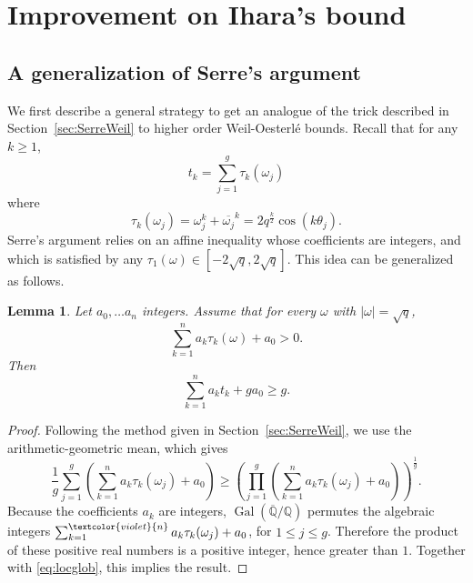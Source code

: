 \documentclass{amsart}
\newtheorem{lemma}[defin]{Lemma}
\newcommand{\Q}{\mathbb{Q}}
\DeclareMathOperator{\Gal}{Gal}
\begin{document}
%
%
\section{Improvement on Ihara's bound}\label{sIS}

\subsection{A generalization of Serre's argument}

We first describe a general strategy to get an analogue of the trick described in Section~\ref{sec:SerreWeil} to higher order Weil-Oesterl\'e bounds. 
Recall that for any $k\geq 1$, 
\begin{equation}\label{eq:locglob}
t_k = \sum_{j=1}^g \tau_k(\omega_j)
\end{equation}
where 
\[
\tau_k(\omega_j) = \omega_j^k + \overline{\omega_j}^k = 2 q^\frac{k}{2} \cos(k \theta_j).
\]
Serre's argument relies on an affine inequality whose coefficients are integers, and which is satisfied by any $\tau_1(\omega) \in [-2\sqrt{q},2\sqrt{q}]$.
This idea can be generalized as follows.
\begin{lemma}\label{lem:GenSer}
Let $a_0, \ldots a_n$ integers. 
Assume that for every $\omega$ with $\left| \omega \right| = \sqrt{q}$,
\begin{equation}\label{eq:ineq}
\sum_{k=1}^n a_k\tau_k(\omega) + a_0> 0.
\end{equation}
Then 
\begin{equation}
\sum_{k=1}^n a_kt_k + ga_0 \geq g.
\end{equation}
\end{lemma}
\begin{proof}
Following the method given in Section~\ref{sec:SerreWeil}, we use the arithmetic-geometric mean, which gives
\begin{equation}\label{eq:genamgm}
\frac{1}{g}\sum_{j=1}^g \left(\sum_{k=1}^n a_k\tau_k(\omega_j) + a_0 \right) \geq \left( \prod_{j=1}^g \left(\sum_{k=1}^n a_k\tau_k(\omega_j)+ a_0 \right) \right)^{\frac{1}{g}}.
\end{equation}
Because the coefficients $a_k$ are integers, $\Gal(\overline{\Q}/\Q)$ permutes the algebraic integers $\sum_{k=1}^{\textcolor{violet}{n}} a_k\tau_k(\omega_j) + a_0$, for $1\leq j \leq g$.
Therefore the product of these positive real numbers is a positive integer, hence greater than $1$. 
Together with \eqref{eq:locglob}, this implies the result.
\end{proof}
\end{document}
